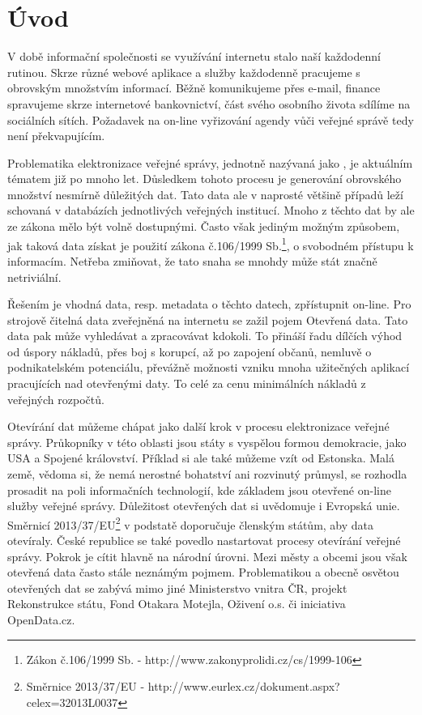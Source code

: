 \chapter{Úvod}

V době informační společnosti se využívání internetu stalo naší každodenní rutinou. Skrze různé webové aplikace a služby každodenně pracujeme s obrovským množstvím informací. Běžně komunikujeme přes e-mail, finance spravujeme skrze internetové bankovnictví, část svého osobního života sdílíme na sociálních sítích. Požadavek na on-line vyřizování agendy vůči veřejné správě tedy není překvapujícím.

Problematika elektronizace veřejné správy, jednotně nazývaná jako , je aktuálním tématem již po mnoho let. Důsledkem tohoto procesu je generování obrovského množství nesmírně důležitých dat. Tato data ale v naprosté většině případů leží schovaná v databázích jednotlivých veřejných institucí. Mnoho z těchto dat by ale ze zákona mělo být volně dostupnými. Často však jediným možným způsobem, jak taková data získat je použití zákona č.106/1999 Sb.\footnote{Zákon č.106/1999 Sb. - http://www.zakonyprolidi.cz/cs/1999-106}, o svobodném přístupu k informacím. Netřeba zmiňovat, že tato snaha se mnohdy může stát značně netriviální.

Řešením je vhodná data, resp. metadata o těchto datech, zpřístupnit on-line. Pro strojově čitelná data zveřejněná na internetu se zažil pojem Otevřená data. Tato data pak může vyhledávat a zpracovávat kdokoli. To přináší řadu dílčích výhod od úspory nákladů, přes boj s korupcí, až po zapojení občanů, nemluvě o podnikatelském potenciálu, převážně možnosti vzniku mnoha užitečných aplikací pracujících nad otevřenými daty. To celé za cenu minimálních nákladů z veřejných rozpočtů.

Otevírání dat můžeme chápat jako další krok v procesu elektronizace veřejné správy. Průkopníky v této oblasti jsou státy s vyspělou formou demokracie, jako USA a Spojené království. Příklad si ale také můžeme vzít od Estonska. Malá země, vědoma si, že nemá nerostné bohatství ani rozvinutý průmysl, se rozhodla prosadit na poli informačních technologií, kde základem jsou otevřené on-line služby veřejné správy. Důležitost otevřených dat si uvědomuje i Evropská unie. Směrnicí 2013/37/EU\footnote{Směrnice 2013/37/EU - http://www.eurlex.cz/dokument.aspx?celex=32013L0037} v podstatě doporučuje členským státům, aby data otevíraly. 
České republice se také povedlo nastartovat procesy otevírání veřejné správy. Pokrok je cítit hlavně na národní úrovni. Mezi městy a obcemi jsou však otevřená data často stále neznámým pojmem. Problematikou a obecně osvětou otevřených dat se zabývá mimo jiné Ministerstvo vnitra ČR\cite{mvcz}, projekt Rekonstrukce státu\cite{rek}, Fond Otakara Motejla\cite{fom}, Oživení o.s.\cite{oz} či iniciativa OpenData.cz\cite{od}.


